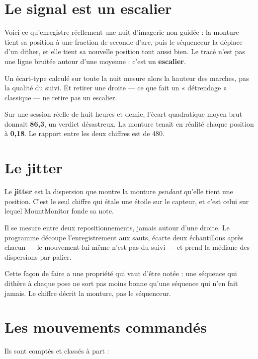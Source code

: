 \section{Le signal est un escalier}

Voici ce qu'enregistre réellement une nuit d'imagerie non guidée : la monture
tient sa position à une fraction de seconde d'arc, puis le séquenceur la
déplace d'un dither, et elle tient sa nouvelle position tout aussi bien. Le
tracé n'est pas une ligne bruitée autour d'une moyenne : c'est un
\textbf{escalier}.

Un écart-type calculé sur toute la nuit mesure alors la hauteur des marches,
pas la qualité du suivi. Et retirer une droite --- ce que fait un
« détrendage » classique --- ne retire pas un escalier.

\begin{info}
Sur une session réelle de huit heures et demie, l'écart quadratique moyen brut
donnait \textbf{86,3\arcsec}, un verdict désastreux. La monture tenait en
réalité chaque position à \textbf{0,18\arcsec}. Le rapport entre les deux
chiffres est de 480.
\end{info}

\section{Le jitter}

Le \textbf{jitter} est la dispersion que montre la monture \emph{pendant}
qu'elle tient une position. C'est le seul chiffre qui étale une étoile sur le
capteur, et c'est celui sur lequel MountMonitor fonde sa note.

Il se mesure entre deux repositionnements, jamais autour d'une droite. Le
programme découpe l'enregistrement aux sauts, écarte deux échantillons après
chacun --- le mouvement lui-même n'est pas du suivi --- et prend la médiane des
dispersions par palier.

\begin{tip}
Cette façon de faire a une propriété qui vaut d'être notée : une séquence qui
dithère à chaque pose ne sort pas moins bonne qu'une séquence qui n'en fait
jamais. Le chiffre décrit la monture, pas le séquenceur.
\end{tip}

\section{Les mouvements commandés}

Ils sont comptés et classés à part :

